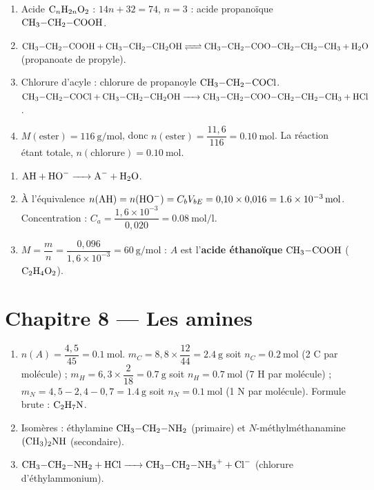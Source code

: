 \begin{enumerate}[label=\arabic*)]
\item Acide $\ce{C_nH_{2n}O2}$ : $14n + 32 = 74$, $n = 3$ : acide propanoïque
$\ce{CH3-CH2-COOH}$.
\item $\ce{CH3-CH2-COOH + CH3-CH2-CH2OH <=> CH3-CH2-COO-CH2-CH2-CH3 + H2O}$
(propanoate de propyle).
\item Chlorure d'acyle : chlorure de propanoyle $\ce{CH3-CH2-COCl}$.
$\ce{CH3-CH2-COCl + CH3-CH2-CH2OH -> CH3-CH2-COO-CH2-CH2-CH3 + HCl}$.
\item $M(\text{ester}) = \SI{116}{\gram\per\mol}$, donc $n(\text{ester}) =
\dfrac{11{,}6}{116} = \SI{0.10}{\mol}$. La réaction étant totale,
$n(\text{chlorure}) = \SI{0.10}{\mol}$.
\end{enumerate}

\begin{enumerate}[label=\arabic*)]
\item $\ce{AH + HO- -> A- + H2O}$.
\item À l'équivalence $n(\ce{AH}) = n(\ce{HO-}) = C_b V_{bE} = 0{,}10\times0{,}016 =
\SI{1.6e-3}{\mol}$. Concentration : $C_a = \dfrac{1{,}6\times10^{-3}}{0{,}020} = \SI{0.08}{\mol\per\litre}$.
\item $M = \dfrac{m}{n} = \dfrac{0{,}096}{1{,}6\times10^{-3}} = \SI{60}{\gram\per\mol}$ :
$A$ est l'\textbf{acide éthanoïque} $\ce{CH3-COOH}$ ($\ce{C2H4O2}$).
\end{enumerate}

\section{Chapitre 8 — Les amines}

\begin{enumerate}[label=\arabic*)]
\item $n(A) = \dfrac{4{,}5}{45} = \SI{0.1}{\mol}$.
$m_C = 8{,}8\times\dfrac{12}{44} = \SI{2.4}{\gram}$ soit $n_C = \SI{0.2}{\mol}$ (2 C par molécule) ;
$m_H = 6{,}3\times\dfrac{2}{18} = \SI{0.7}{\gram}$ soit $n_H = \SI{0.7}{\mol}$ (7 H par molécule) ;
$m_N = 4{,}5 - 2{,}4 - 0{,}7 = \SI{1.4}{\gram}$ soit $n_N = \SI{0.1}{\mol}$ (1 N par molécule).
Formule brute : $\ce{C2H7N}$.
\item Isomères : éthylamine $\ce{CH3-CH2-NH2}$ (primaire) et
$N$-méthylméthanamine $\ce{(CH3)2NH}$ (secondaire).
\item $\ce{CH3-CH2-NH2 + HCl -> CH3-CH2-NH3+ + Cl-}$ (chlorure d'éthylammonium).
\end{enumerate}

